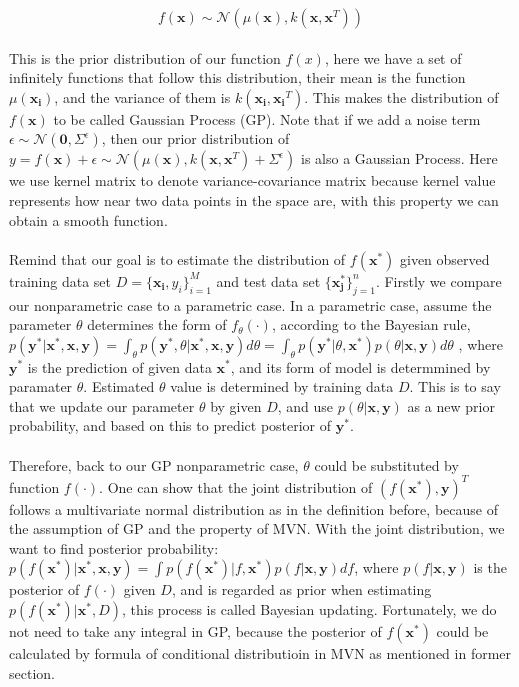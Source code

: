 \begin{equation}
f(\boldsymbol{x}) \sim \mathcal{N}(\mu(\boldsymbol{x}), k(\boldsymbol{x},\boldsymbol{x}^T)) 
\end{equation}
\\ 
This is the prior distribution of our function $f(x)$, here we have a set of infinitely functions that follow this distribution, their mean is the function $\mu(\boldsymbol{x_i})$, and the variance of them is $k(\boldsymbol{x_i},\boldsymbol{x_i}^T)$. This makes the distribution of $f(\boldsymbol{x})$ to be called Gaussian Process (GP). Note that if we add a noise term $\epsilon \sim \mathcal{N}(\boldsymbol{0},\varSigma^{\epsilon})$, then our prior distribution of $y = f(\boldsymbol{x}) + \epsilon \sim \mathcal{N}(\mu(\boldsymbol{x}), k(\boldsymbol{x},\boldsymbol{x}^T) + \varSigma^{\epsilon})$ is also a Gaussian Process. Here we use kernel matrix to denote variance-covariance matrix because kernel value represents how near two data points in the space are, with this property we can obtain a smooth function.  \\ \\
Remind that our goal is to estimate the distribution of $f(\boldsymbol{x^*})$ given observed training data set $D = \{\boldsymbol{x_i}, y_i\}_{i = 1}^M$ and test data set $\{\boldsymbol{x_j^*}\}_{j = 1}^n$. Firstly we compare our nonparametric case to a parametric case. In a parametric case, assume the parameter $\theta$ determines the form of $f_{\theta}(\cdot)$, according to the Bayesian rule, 
$
p(\boldsymbol{y^*} | \boldsymbol{x^*}, \boldsymbol{x}, \boldsymbol{y}) = \int_{\theta} p(\boldsymbol{y^*}, \theta |  \boldsymbol{x^*}, \boldsymbol{x}, \boldsymbol{y})d\theta = \int_{\theta} p(\boldsymbol{y^*} | \theta, \boldsymbol{x^*})p(\theta | \boldsymbol{x}, \boldsymbol{y})d\theta
$
, where $\boldsymbol{y^*}$ is the prediction of given data $\boldsymbol{x^*}$, and its form of model is determmined by paramater $\theta$. Estimated $\theta$ value is determined by training data $D$. This is to say that we update our parameter $\theta$ by given $D$, and use $p(\theta |  \boldsymbol{x}, \boldsymbol{y})$ as a new prior probability, and based on this to predict posterior of $\boldsymbol{y^*}$.  \\ \\
Therefore, back to our GP nonparametric case, $\theta$ could be substituted by function $f(\cdot)$. One can show that the joint distribution of $(f(\boldsymbol{x^*}), \boldsymbol{y})^T$ follows a multivariate normal distribution as in the definition before, because of the assumption of GP and the property of MVN. With the joint distribution, we want to find posterior probability:  $p(f(\boldsymbol{x^*}) | \boldsymbol{x^*}, \boldsymbol{x}, \boldsymbol{y}) = \int p(f(\boldsymbol{x^*})  | f, \boldsymbol{x^*})p(f | \boldsymbol{x}, \boldsymbol{y})df$, where $p(f | \boldsymbol{x}, \boldsymbol{y})$ is the posterior of $f(\cdot)$ given $D$, and is regarded as prior when estimating $p(f(\boldsymbol{x^*}) | \boldsymbol{x^*}, D)$, this process is called Bayesian updating. Fortunately, we do not need to take any integral in GP, because the posterior of $f(\boldsymbol{x^*})$ could be calculated by formula of conditional distributioin in MVN as mentioned in former section. 

